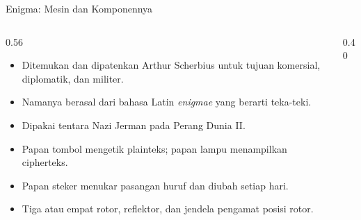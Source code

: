 \documentclass[aspectratio=169,11pt]{beamer}
\begin{document}
\begin{frame}{Enigma: Mesin dan Komponennya}
    \begin{columns}[T,onlytextwidth]
        \begin{column}{0.56\textwidth}
            \footnotesize
            \begin{itemize}
                \item Ditemukan dan dipatenkan Arthur Scherbius untuk tujuan
                      komersial, diplomatik, dan militer.
                \item Namanya berasal dari bahasa Latin \textit{enigmae} yang
                      berarti teka-teki.
                \item Dipakai tentara Nazi Jerman pada Perang Dunia II.
                \item Papan tombol mengetik plainteks; papan lampu menampilkan
                      cipherteks.
                \item Papan steker menukar pasangan huruf dan diubah setiap
                      hari.
                \item Tiga atau empat rotor, reflektor, dan jendela pengamat
                      posisi rotor.
            \end{itemize}
        \end{column}
        \begin{column}{0.40\textwidth}
            \centering
        \end{column}
    \end{columns}
\end{frame}
\end{document}
